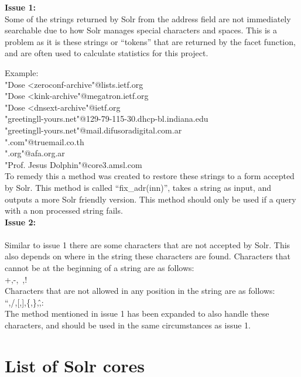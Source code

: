 \documentclass[a4paper,english]{report}
\begin{document}
\textbf{Issue 1:}\\

Some of the strings returned by Solr from the address field are not immediately searchable due to how Solr manages special characters and spaces. 
This is a problem as it is these strings or “tokens” that are returned by the facet function, and are often used to calculate statistics for this project.

Example:\\
"Dose <zeroconf-archive"@lists.ietf.org\\
"Dose <kink-archive"@megatron.ietf.org\\
"Dose <dnsext-archive"@ietf.org\\
"greetingll-yours.net"@129-79-115-30.dhcp-bl.indiana.edu\\
"greetingll-yours.net"@mail.difusoradigital.com.ar\\
".com"@truemail.co.th\\
".org"@afa.org.ar\\
"Prof. Jesus Dolphin"@core3.amsl.com\\

To remedy this a method was created to restore these strings to a form accepted by Solr.
This method is called “fix\_adr(inn)”, takes a string as input, and outputs a more Solr friendly version.  
This method should only be used if a query with a non processed string fails.\\

\noindent
\textbf{Issue 2:}\\\\
Similar to issue 1 there are some characters that are not accepted by Solr.
This also depends on where in the string these characters are found.
Characters that cannot be at the beginning of a string are as follows:\\

+,-,~,!\\



Characters that are not allowed in any position in the string are as follows:\\

“,/,[,],\{,\},\^,:\\

The method mentioned in issue 1 has been expanded to also handle these characters, and should be used in the same circumstances as issue 1. 


\section{List of Solr cores}
\end{document}
